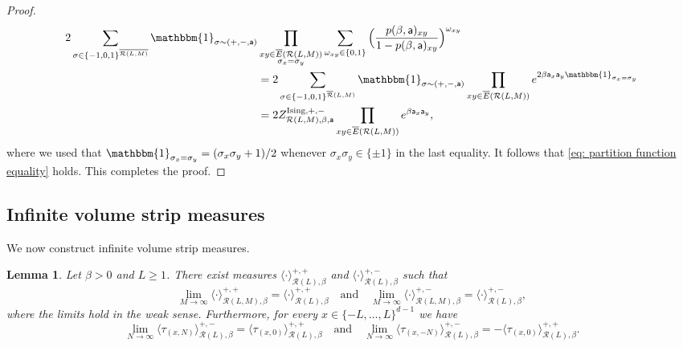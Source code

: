 \documentclass[11pt,a4paper]{article}
\numberwithin{equation}{section}
\theoremstyle{plain}
\newtheorem{Lem}[Thm]{Lemma}
\theoremstyle{definition}
\begin{document}
\begin{proof}
\begin{align}
\begin{aligned}
2\sum_{\sigma\in \{-1,0,1\}^{\overline{\mathcal R(L,M)}}}\mathbbm{1}_{\sigma\sim (+,-,\mathsf{a})}&\prod_{\substack{xy \in \overline{E}(\mathcal{R}(L,M))\\ \sigma_x=\sigma_y}}\sum_{\omega_{xy}\in \{0,1\}} \Big(\frac{p(\beta,\mathsf{a})_{xy}}{1-p(\beta,\mathsf{a})_{xy}}\Big)^{\omega_{xy}}\\
&=2\sum_{\sigma\in \{-1,0,1\}^{\overline{\mathcal{R}}(L,M)}}\mathbbm{1}_{\sigma\sim (+,-,\mathsf{a})}\prod_{xy \in \overline{E}(\mathcal{R}(L,M))}e^{2\beta \mathsf{a}_x \mathsf{a}_y \mathbbm{1}_{\sigma_x=\sigma_y}}
\\&=2 Z^{\textup{Ising},+,-}_{\mathcal{R}(L,M),\beta,\mathsf{a}}\prod_{xy\in \overline{E}(\mathcal{R}(L,M))}e^{\beta\mathsf{a}_x\mathsf{a}_y},
\end{aligned}
\end{align}
where we used that $\mathbbm{1}_{\sigma_x=\sigma_y}=(\sigma_x\sigma_y+1)/2$ whenever $\sigma_x\sigma_y\in \{\pm 1\}$ in the last equality. It follows that
\eqref{eq: partition function equality} holds. This completes the proof. 
\end{proof}




\subsection{Infinite volume strip measures}

We now construct infinite volume strip measures.

\begin{Lem}\label{lem:++}
Let $\beta> 0$ and $L\geq 1$. There exist measures $\langle \cdot \rangle^{+,+}_{\mathcal{R}(L),\beta}$ and $\langle \cdot \rangle^{+,-}_{\mathcal{R}(L),\beta}$ such that 
\begin{equation}
\lim_{M\to\infty}\langle \cdot \rangle^{+,+}_{\mathcal{R}(L,M),\beta}=\langle \cdot \rangle^{+,+}_{\mathcal{R}(L),\beta}  \quad \text{and} \quad \lim_{M\to\infty}\langle \cdot \rangle^{+,-}_{\mathcal{R}(L,M),\beta}=\langle \cdot \rangle^{+,-}_{\mathcal{R}(L),\beta},
\end{equation}
where the limits hold in the weak sense.
Furthermore, for every $x\in \{-L,\ldots,L\}^{d-1}$ we have 
\begin{equation}\label{eq:magnetisation convergence}
\lim_{N\to\infty} \langle \tau_{(x,N)} \rangle^{+,-}_{\mathcal{R}(L),\beta}=\langle \tau_{(x,0)} \rangle^{+,+}_{\mathcal{R}(L),\beta} \quad \text{and} \quad \lim_{N\to\infty} \langle \tau_{(x,-N)} \rangle^{+,-}_{\mathcal{R}(L),\beta}=-\langle \tau_{(x,0)} \rangle^{+,+}_{\mathcal{R}(L),\beta}.
\end{equation}
\end{Lem}
\end{document}
